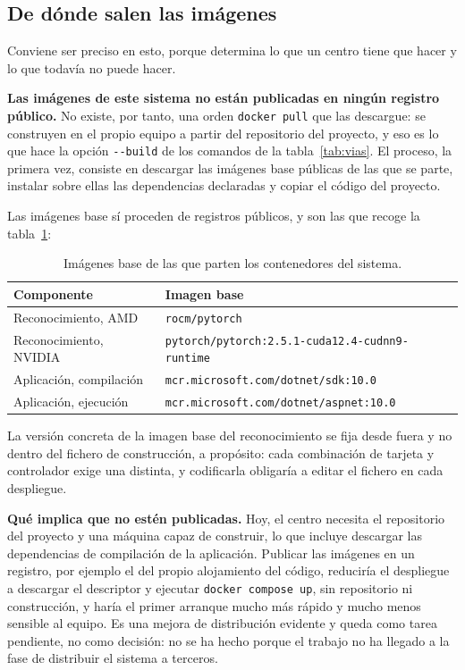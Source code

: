 \subsection*{De dónde salen las imágenes}

Conviene ser preciso en esto, porque determina lo que un centro tiene que hacer y lo que
todavía no puede hacer.

\textbf{Las imágenes de este sistema no están publicadas en ningún registro público.} No
existe, por tanto, una orden \texttt{docker pull} que las descargue: se construyen en el
propio equipo a partir del repositorio del proyecto, y eso es lo que hace la opción
\texttt{-{}-build} de los comandos de la tabla~\ref{tab:vias}. El proceso, la primera vez,
consiste en descargar las imágenes base públicas de las que se parte, instalar sobre ellas
las dependencias declaradas y copiar el código del proyecto.

Las imágenes base sí proceden de registros públicos, y son las que recoge la
tabla~\ref{tab:imagenes-base}:

\begin{table}[H]
\centering
\footnotesize
\begin{tabular}{|l|l|}
\hline
\textbf{Componente} & \textbf{Imagen base} \\
\hline
Reconocimiento, AMD & \texttt{rocm/pytorch} \\
\hline
Reconocimiento, NVIDIA & \texttt{pytorch/pytorch:2.5.1-cuda12.4-cudnn9-runtime} \\
\hline
Aplicación, compilación & \texttt{mcr.microsoft.com/dotnet/sdk:10.0} \\
\hline
Aplicación, ejecución & \texttt{mcr.microsoft.com/dotnet/aspnet:10.0} \\
\hline
\end{tabular}
\caption{Imágenes base de las que parten los contenedores del sistema.}
\label{tab:imagenes-base}
\end{table}

La versión concreta de la imagen base del reconocimiento se fija desde fuera y no dentro del
fichero de construcción, a propósito: cada combinación de tarjeta y controlador exige una
distinta, y codificarla obligaría a editar el fichero en cada despliegue.

\textbf{Qué implica que no estén publicadas.} Hoy, el centro necesita el repositorio del
proyecto y una máquina capaz de construir, lo que incluye descargar las dependencias de
compilación de la aplicación. Publicar las imágenes en un registro, por ejemplo el del propio
alojamiento del código, reduciría el despliegue a descargar el descriptor y ejecutar
\texttt{docker compose up}, sin repositorio ni construcción, y haría el primer arranque
mucho más rápido y mucho menos sensible al equipo. Es una mejora de distribución evidente y
queda como tarea pendiente, no como decisión: no se ha hecho porque el trabajo no ha llegado
a la fase de distribuir el sistema a terceros.

